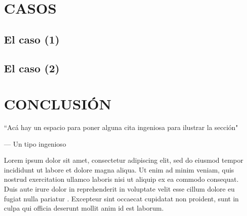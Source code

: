 \lipsum[1]


\section{CASOS}

\lipsum[1]


\subsection{El caso (1)}

\lipsum[1]


\subsection{El caso (2)}


\lipsum[1]


\section{CONCLUSIÓN}


\epigraph{``Acá hay un espacio para poner alguna cita ingeniosa para ilustrar la sección"}{--- \textup{Un tipo ingenioso}}

Lorem ipsum dolor sit amet, consectetur adipiscing elit, sed do eiusmod tempor incididunt ut labore et dolore magna aliqua. Ut enim ad minim veniam, quis nostrud exercitation ullamco laboris nisi ut aliquip ex ea commodo consequat. Duis aute irure dolor in reprehenderit \cite{ruiz_nicolini_juan_pablo_fuego_nodate} in voluptate velit esse cillum dolore eu fugiat nulla pariatur \citep{ruiz_nicolini_impacto_2017}. Excepteur sint occaecat cupidatat non proident, sunt in culpa qui officia deserunt mollit anim id est laborum. %

\lipsum[1-3]


\renewcommand{\bibname}{REFERENCIAS}%



